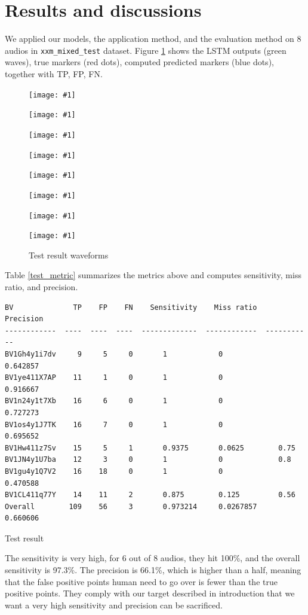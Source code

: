 \documentclass{article}
\begin{document}
    \section{Results and discussions}
    We applied our models, the application method, and the evaluation method on 8 audios in \lstinline|xxm_mixed_test| dataset. Figure \ref{test_wave} shows the LSTM outputs (green waves), true markers (red dots), computed predicted markers (blue dots), together with TP, FP, FN. 
    \newcommand{\addwave}[1]{
        \begin{minipage}{0.32\linewidth}
            \texttt{[image: \#1]}
        \end{minipage}        
    }
    \begin{figure}[H]
        \addwave{figures/test_i7dv.png}
        \addwave{figures/test_X7AP.png}
        \addwave{figures/test_t7Xb.png}

        \addwave{figures/test_J7TK.png}
        \addwave{figures/test_t7Xb.png}
        \addwave{figures/test_z7Sv.png}

        \addwave{figures/test_U7ba.png}
        \addwave{figures/test_Q7V2.png}

        \caption{Test result waveforms}
        \label{test_wave}
    \end{figure}
    
    Table \ref{test_metric} summarizes the metrics above and computes sensitivity, miss ratio, and precision.
\begin{table}[H]
    \begin{lstlisting}
BV              TP    FP    FN    Sensitivity    Miss ratio    Precision
------------  ----  ----  ----  -------------  ------------  -----------
BV1Gh4y1i7dv     9     5     0       1            0             0.642857
BV1ye411X7AP    11     1     0       1            0             0.916667
BV1n24y1t7Xb    16     6     0       1            0             0.727273
BV1os4y1J7TK    16     7     0       1            0             0.695652
BV1Hw411z7Sv    15     5     1       0.9375       0.0625        0.75
BV1JN4y1U7ba    12     3     0       1            0             0.8
BV1gu4y1Q7V2    16    18     0       1            0             0.470588
BV1CL411q77Y    14    11     2       0.875        0.125         0.56
Overall        109    56     3       0.973214     0.0267857     0.660606
    \end{lstlisting}
    \caption{Test result}
    \label{test_metric}
\end{table}

    The sensitivity is very high, for 6 out of 8 audios, they hit 100\%, and the overall sensitivity is 97.3\%. The precision is 66.1\%, which is higher than a half, meaning that the false positive points human need to go over is fewer than the true positive points. They comply with our target described in introduction that we want a very high sensitivity and precision can be sacrificed.
\end{document}

